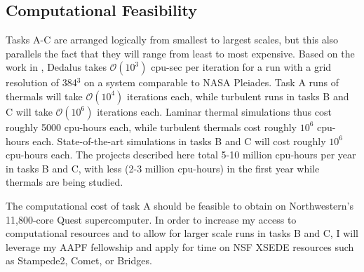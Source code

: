 \documentclass[aasms,12pt]{article}
\begin{document}
\subsection{Computational Feasibility}
Tasks A-C are arranged logically from smallest to largest scales, but this also parallels the fact that they will range from least to most expensive.
Based on the work in \citet{anders&brown2017, anders&all2018, anders&all2019, andersLB2019}, Dedalus takes $\mathcal{O}(10^3)$ cpu-sec per iteration for a run with a grid resolution of 384$^3$ on a system comparable to NASA Pleiades.
Task A runs of thermals will take $\mathcal{O}(10^4)$ iterations each, while turbulent runs in tasks B and C will take $\mathcal{O}(10^6)$ iterations each.
Laminar thermal simulations thus cost roughly 5000 cpu-hours each, while turbulent thermals cost roughly $10^6$ cpu-hours each.
State-of-the-art simulations in tasks B and C will cost roughly $10^6$ cpu-hours each.
The projects described here total 5-10 million cpu-hours per year in tasks B and C, with less (2-3 million cpu-hours) in the first year while thermals are being studied.

The computational cost of task A should be feasible to obtain on Northwestern's 11,800-core Quest supercomputer.
In order to increase my access to computational resources and to allow for larger scale runs in tasks B and C, I will leverage my AAPF fellowship and apply for time on NSF XSEDE resources such as Stampede2, Comet, or Bridges.
\end{document}
